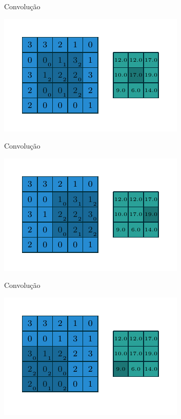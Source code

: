 \documentclass[10pt]{beamer}
\begin{document}
\begin{frame}{Convolução}
\begin{center}
\includegraphics[scale=1.5]{images/numerical_no_padding_no_strides_04.pdf}
\end{center}
\end{frame}

\begin{frame}{Convolução}
\begin{center}
\includegraphics[scale=1.5]{images/numerical_no_padding_no_strides_05.pdf}
\end{center}
\end{frame}

\begin{frame}{Convolução}
\begin{center}
\includegraphics[scale=1.5]{images/numerical_no_padding_no_strides_06.pdf}
\end{center}
\end{frame}
\end{document}
